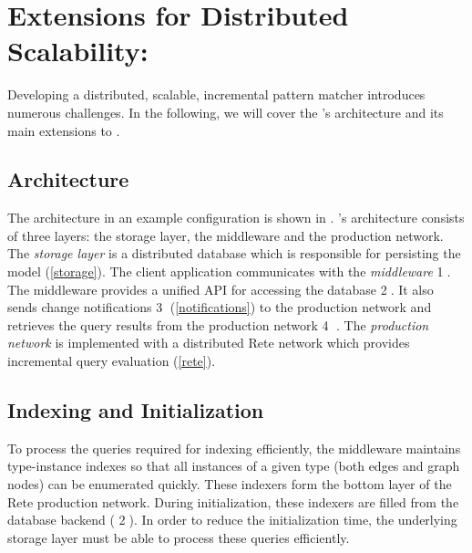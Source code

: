 

\section{Extensions for Distributed Scalability: \iqd{}}
\label{iqd-architecture}

Developing a distributed, scalable, incremental pattern matcher introduces numerous challenges. In the following, we will cover the \iqd{}'s architecture and its main extensions to \eiq{}.


\subsection{Architecture}

The \iqd{} architecture in an example configuration is shown in . \iqd{}'s architecture consists of three layers: the storage layer, the middleware and the production network. 
The \emph{storage layer} is a distributed database which is responsible for persisting the model (\autoref{storage}). 
The client application communicates with the \emph{middleware} \textcircled{1}. The middleware provides a unified API for accessing the database \textcircled{2}. It also sends change notifications \textcircled{3} (\autoref{notifications}) to the production network and retrieves the query results from the production network \textcircled{4} . 
The \emph{production network} is implemented with a distributed Rete network which provides incremental query evaluation (\autoref{rete}).

\subsection{Indexing and Initialization}
\label{indexing}

To process the queries required for indexing efficiently, the \iqd{} middleware maintains type-instance indexes so that all instances of a given type (both edges and graph nodes) can be enumerated quickly. These indexers form the bottom layer of the Rete production network. During initialization, these indexers are filled from the database backend ( \textcircled{2}). In order to reduce the initialization time, the underlying storage layer must be able to process these queries efficiently. 

